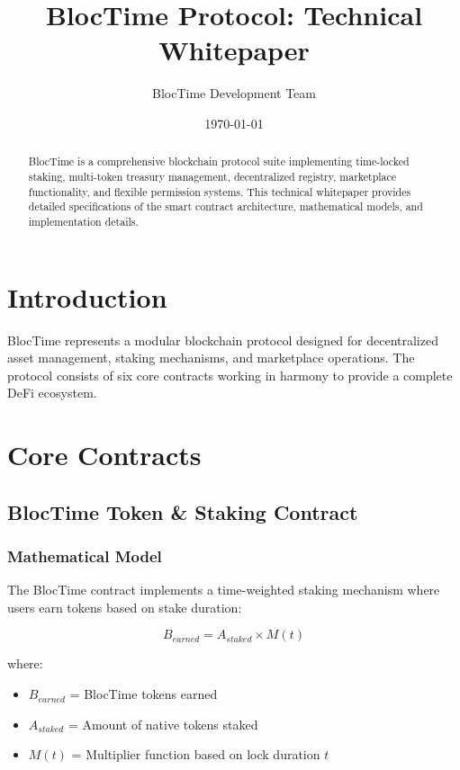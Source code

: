 \documentclass[11pt,a4paper]{article}
\title{BlocTime Protocol: Technical Whitepaper}
\author{BlocTime Development Team}
\date{\today}
\begin{document}
\maketitle

\begin{abstract}
BlocTime is a comprehensive blockchain protocol suite implementing time-locked staking, multi-token treasury management, decentralized registry, marketplace functionality, and flexible permission systems. This technical whitepaper provides detailed specifications of the smart contract architecture, mathematical models, and implementation details.
\end{abstract}

\tableofcontents
\newpage

\section{Introduction}

BlocTime represents a modular blockchain protocol designed for decentralized asset management, staking mechanisms, and marketplace operations. The protocol consists of six core contracts working in harmony to provide a complete DeFi ecosystem.

\section{Core Contracts}

\subsection{BlocTime Token \& Staking Contract}

\subsubsection{Mathematical Model}

The BlocTime contract implements a time-weighted staking mechanism where users earn tokens based on stake duration:

\begin{equation}
B_{earned} = A_{staked} \times M(t)
\end{equation}

where:
\begin{itemize}
\item $B_{earned}$ = BlocTime tokens earned
\item $A_{staked}$ = Amount of native tokens staked
\item $M(t)$ = Multiplier function based on lock duration $t$
\end{itemize}
\end{document}
